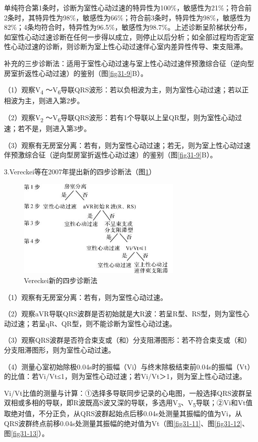 单纯符合第1条时，诊断为室性心动过速的特异性为100\%，敏感性为21\%；符合前2条时，其特异性为98\%，敏感性为66\%；符合前3条时，特异性为98\%，敏感性为82\%；4条均符合时，特异性为96.5\%，敏感性为98.7\%。上述诊断呈阶梯状分布，如室性心动过速诊断在任何一步得以成立，则停止以后分析；如全部过程均否定室性心动过速的诊断，则诊断为室上性心动过速伴心室内差异性传导、束支阻滞。

补充的三步诊断法：适用于室性心动过速与室上性心动过速伴预激综合征（逆向型房室折返性心动过速）的鉴别（图\ref{fig31-9}B）。

（1）观察V\textsubscript{4} ～V\textsubscript{6}导联QRS波形：若以负相波为主，则为室性心动过速；若以正相波为主，则进入第2步。

（2）观察V\textsubscript{2} ～V\textsubscript{6}导联QRS波形：若有1个导联以上呈QR型，则为室性心动过速；若不是，则进入第3步。

（3）观察有无房室分离：若有，则为室性心动过速；若无，则为室上性心动过速伴预激综合征（逆向型房室折返性心动过速）的鉴别（图\ref{fig31-9}B）。

3.Vereckei等在2007年提出新的四步诊断法（图\ref{fig31-10}）

\begin{figure}[!htbp]
 \centering
 \includegraphics[width=3.13542in,height=1.88542in]{./images/Image00513.jpg}
 \captionsetup{justification=centering}
 \caption{Vereckei新的四步诊断法}
 \label{fig31-10}
  \end{figure} 

（1）观察有无房室分离：若有，则为室性心动过速。

（2）观察aVR导联QRS波群是否初始就是大R波：若呈R型、RS型，则为室性心动过速；若呈qR、QR型，则不能诊断为室性心动过速。

（3）观察QRS波群是否符合束支或（和）分支阻滞图形：若不符合束支或（和）分支阻滞图形，则为室性心动过速。

（4）测量心室初始除极0.04s时的振幅（Vi）与终末除极结束前0.04s的振幅（Vt）的比值：若Vi/Vt≤1，则为室性心动过速；若Vi/Vt＞1，则为室上性心动过速。

Vi/Vt比值的测量与计算：①选择多导联同步记录的心电图，一般选择QRS波群呈双相或多相的导联，即R波既高S波又深的导联，多选用V\textsubscript{3}、V\textsubscript{5}导联；②Vi和Vt值取绝对值，不分正负，从QRS波群起始点后移0.04s处测量其振幅的值为Vi，从QRS波群终点前移0.04s处测量其振幅的绝对值为Vt（图\ref{fig31-11}、图\ref{fig31-12}、图\ref{fig31-13}）。

